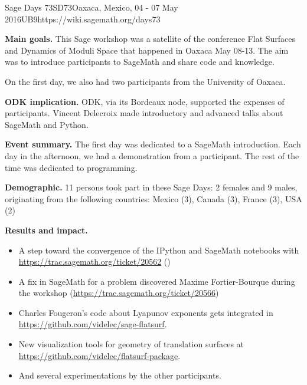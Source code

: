 \begin{event}{Sage Days 73}{SD73}{Oaxaca, Mexico, 04 - 07 May 2016}{UB}{9}{https://wiki.sagemath.org/days73}

\textbf{Main goals.}
This Sage workshop was a satellite of the conference Flat Surfaces and
Dynamics of Moduli Space that happened in Oaxaca May 08-13. The aim was to
introduce participants to SageMath and share code and knowledge.

On the first day, we also had two participants from the University of 
Oaxaca.

\textbf{ODK implication.} ODK, via its Bordeaux node, supported the expenses
of participants. Vincent Delecroix made introductory and advanced talks about
SageMath and Python.
  
\textbf{Event summary.} The first day was dedicated to a SageMath introduction.
Each day in the afternoon, we had a demonstration from a participant. The rest
of the time was dedicated to programming.

\textbf{Demographic.}
11 persons took part in these Sage Days: 2 females and 9 males, originating
from the following countries: Mexico (3), Canada (3), France (3), USA (2)

\textbf{Results and impact.}
\begin{itemize}
\item A step toward the convergence of the IPython and SageMath notebooks with \url{https://trac.sagemath.org/ticket/20562} ()
\item A fix in SageMath for a problem discovered Maxime Fortier-Bourque during the workshop (\url{https://trac.sagemath.org/ticket/20566})
\item Charles Fougeron's code about Lyapunov exponents gets integrated in \url{https://github.com/videlec/sage-flatsurf}.
\item New visualization tools for geometry of translation surfaces at \url{https://github.com/videlec/flatsurf-package}.
\item And several experimentations by the other participants.
\end{itemize}

\end{event}
